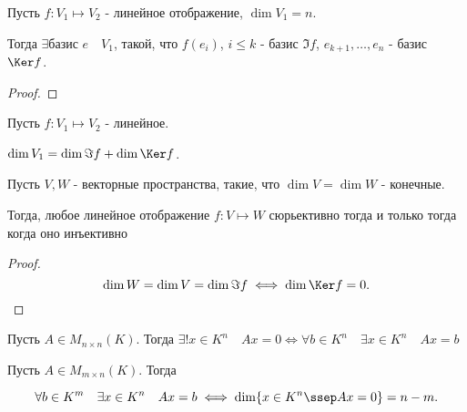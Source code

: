 \begin{theorem} \thmslashn

    Пусть $f : V_1 \mapsto V_2$ - линейное отображение, $\dim V_1 = n$.

    Тогда $\exists{\text{базис } e}\quad V_1$, такой, что $f(e_{i})$, $i \le k$ - базис $\Im f$, $e_{k+1}, \ldots, e_{n}$ - базис $\Ker f$.
    \begin{proof} \thmslashn
    
        \TODO
    \end{proof}
\end{theorem}
\begin{consequence} \thmslashn

    Пусть $f : V_1 \mapsto V_2$ - линейное.

    $\dim V_1 = \dim \Im f + \dim \Ker f$.
\end{consequence}
\begin{consequence} \thmslashn

    Пусть $V, W$ - векторные пространства, такие, что $\dim V = \dim W$ - конечные.

    Тогда, любое линейное отображение $f : V \mapsto W$ сюрьективно тогда и только тогда когда оно инъективно
    \begin{proof} \thmslashn
    
        \[ \dim W = \dim V = \dim \Im f \iff \dim \Ker f = 0 .\qedhere\] 
    \end{proof}
\end{consequence}
\begin{consequence} \thmslashn

    Пусть $A\in M_{n \times n}(K)$. Тогда $\exists!{x\in K^{n}}\quad Ax = 0 \iff \forall{b\in K^{n}}\quad \exists{x\in K^{n}}\quad Ax = b$
\end{consequence}
\begin{consequence} \thmslashn

    Пусть $A\in M_{m \times n}(K)$. Тогда

    \[ \forall{b\in K^{m}}\quad \exists{x\in K^{n}}\quad Ax=b \iff \dim \{x\in K^{n}\ssep Ax = 0\} = n - m   .\] 
\end{consequence}
